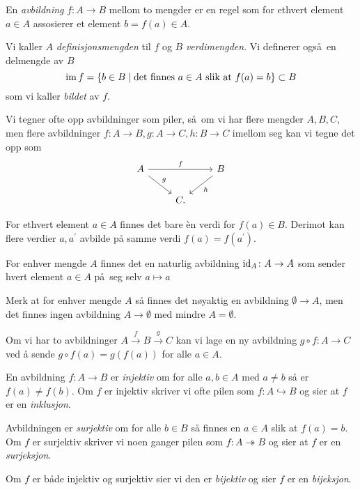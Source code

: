 \begin{definition}
    En \textit{avbildning} $f\colon A\to B$ mellom to mengder er en
    regel som for ethvert element $a\in A$ assosierer et element
    $b = f(a)\in A$.

    Vi kaller $A$ \textit{definisjonsmengden} til $f$
    og $B$ \textit{verdimengden}.
    Vi definerer også en delmengde av $B$
    \[
        \operatorname{im} f = \{b\in B\mid \mbox{det finnes $a\in A$ slik at } f(a) = b\}
        \subset B
    \]
    som vi kaller \textit{bildet} av $f$.

    Vi tegner ofte opp avbildninger som piler,
    så om vi har flere mengder $A, B, C$, men flere avbildninger
    $f\colon A\to B, g\colon A\to C, h\colon B\to C$
    imellom seg kan vi tegne det opp som
    \[
        \begin{tikzcd}
            A
            \ar{rr}{f}
            \ar{rd}{g}
            &&
            B
            \ar{ld}{h}
            \\
            &
            C.
        \end{tikzcd}
    \]
\end{definition}

For ethvert element $a\in A$ finnes det bare \`en verdi for $f(a)\in B$.
Derimot kan flere verdier $a, a^\prime$ avbilde på samme verdi
$f(a) = f(a^\prime)$.

\begin{example}
    For enhver mengde $A$ finnes det en naturlig avbildning
    $\operatorname{id}_A\colon A\to A$ som sender hvert element $a\in A$
    på seg selv $a\mapsto a$
\end{example}

\begin{remark}
    Merk at for enhver mengde $A$ så finnes det
    nøyaktig en avbildning $\emptyset \to A$,
    men det finnes ingen avbildning $A\to \emptyset$ med mindre $A = \emptyset$.
\end{remark}

\begin{example}
    Om vi har to avbildninger $A\xrightarrow{f} B\xrightarrow{g} C$
    kan vi lage en ny avbildning $g\circ f\colon A\to C$
    ved å sende $g\circ f(a) = g(f(a))$ for alle $a\in A$.
\end{example}

\begin{definition}
    En avbildning $f\colon A\to B$ er \textit{injektiv} om for alle $a,b\in A$ med $a\neq b$
    så er $f(a)\neq f(b)$.
    Om $f$ er injektiv skriver vi ofte pilen som $f\colon A\hookrightarrow B$
    og sier at $f$ er en \textit{inklusjon}.

    Avbildningen er \textit{surjektiv} om for alle $b\in B$ så finnes en $a\in A$
    slik at $f(a) = b$.
    Om $f$ er surjektiv skriver vi noen ganger pilen som
    $f\colon A\twoheadrightarrow B$ og sier at $f$ er en \textit{surjeksjon}.

    Om $f$ er både injektiv og surjektiv sier vi den er \textit{bijektiv}
    og sier $f$ er en \textit{bijeksjon}.
\end{definition}

